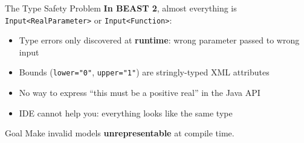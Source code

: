 \documentclass[aspectratio=169,11pt]{beamer}
\newcommand{\code}[1]{\texttt{#1}}
\begin{document}
\begin{frame}{The Type Safety Problem}
\textbf{In BEAST 2}, almost everything is \code{Input<RealParameter>} or \code{Input<Function>}:

\vspace{0.5em}
\begin{itemize}
\item Type errors only discovered at \textbf{runtime}: wrong parameter passed to wrong input
\item Bounds (\code{lower="0"}, \code{upper="1"}) are stringly-typed XML attributes
\item No way to express ``this must be a positive real'' in the Java API
\item IDE cannot help you: everything looks like the same type
\end{itemize}

\vspace{1em}
\begin{exampleblock}{Goal}
Make invalid models \textbf{unrepresentable} at compile time.
\end{exampleblock}
\end{frame}

\end{document}
